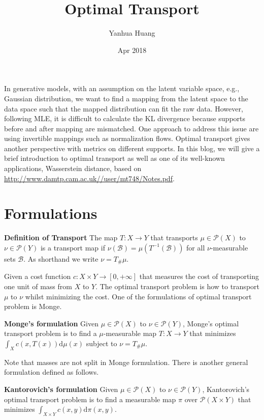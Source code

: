 \documentclass[a4paper,11pt]{article}
\begin{document}
\title{Optimal Transport}
\author{Yanhua Huang}
\date{Apr 2018}
\maketitle

In generative models, with an assumption on the latent variable space, e.g., Gaussian distribution, we want to find a mapping from the latent space to the data space such that the mapped distribution can fit the raw data. However, following MLE, it is difficult to calculate the KL divergence because supports before and after mapping are mismatched. One approach to address this issue are using invertible mappings such as normalization flows. Optimal transport gives another perspective with metrics on different supports. In this blog, we will give a brief introduction to optimal transport as well as one of its well-known applications, Wasserstein distance, based on \url{http://www.damtp.cam.ac.uk//user/mt748/Notes.pdf}.

\section*{Formulations}

\textbf{Definition of Transport} The map $T: X \rightarrow Y$ that transports $\mu \in \mathcal{P}(X)$ to $\nu \in \mathcal{P}(Y)$ is a transport map if $\nu(\mathcal{B}) = \mu(T^{-1}(\mathcal{B}))$ for all $\nu$-measurable sets $\mathcal{B}$. As shorthand we write $\nu = T_\# \mu$.

Given a cost function $c: X \times Y \rightarrow [0, +\infty]$ that measures the cost of transporting one unit of mass from $X$ to $Y$. The optimal transport problem is how to transport $\mu$ to $\nu$ whilst minimizing the cost. One of the formulations of optimal transport problem is Monge.

\textbf{Monge's formulation} Given $\mu \in \mathcal{P}(X)$ to $\nu \in \mathcal{P}(Y)$, Monge's optimal transport problem is to find a $\mu$-measurable map $T: X \rightarrow Y$ that minimizes $\int_X c(x, T(x))\mathrm{d}\mu(x)$ subject to $\nu = T_\# \mu$.

Note that masses are not split in Monge formulation. There is another general formulation defined as follows.

\textbf{Kantorovich's formulation} Given $\mu \in \mathcal{P}(X)$ to $\nu \in \mathcal{P}(Y)$, Kantorovich's optimal transport problem is to find a measurable map $\pi$ over $\mathcal{P}(X \times Y)$ that minimizes $\int_{X \times Y} c(x, y)\mathrm{d}\pi(x, y)$.
\end{document}
